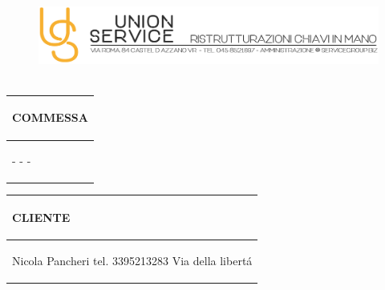 \documentclass[a4paper]{article}
\begin{document}
                        \begin{figure}[!t]
                        \includegraphics[width=15.8cm, height=3cm]{intestazioneAlta2.jpg}
                        \end{figure}

                        \noindent\begin{tabular}{| L{72.2mm} |}
                            \hline
                            \vspace{2.5mm}
                            \begin{spacing}{0}
                            \textbf{COMMESSA}
                            \end{spacing}\\
                            \hline
                            \vspace{4mm}
                            \begin{spacing}{1.2}

                        - \newline - \newline -
                          \end{spacing}\\
                            \hline
                          \end{tabular}
                          \quad
                          \begin{tabular}{ | R{72.2mm} | }
                            \hline
                            \vspace{2.5mm}
                            \begin{spacing}{0}
                            \textbf{CLIENTE}
                            \end{spacing}\\
                            \hline
                            \vspace{4mm}
                            \begin{spacing}{1.2}

                       Nicola Pancheri \newline tel. 3395213283 \newline Via della libert\'a
                          \end{spacing}\\
                            \hline
                          \end{tabular}
\end{document}
